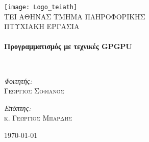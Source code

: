 \begin{titlepage}
\begin{center}

\texttt{[image: Logo\_teiath]}~\\[1cm]

\textsc{\LARGE ΤΕΙ ΑΘΗΝΑΣ ΤΜΗΜΑ ΠΛΗΡΟΦΟΡΙΚΗΣ}\\[1.5cm]

\textsc{\Large ΠΤΥΧΙΑΚΗ ΕΡΓΑΣΙΑ}\\[0.5cm]

\HRule \\[0.4cm]
{ \huge \bfseries Προγραμματισμός με τεχνικές GPGPU \\[0.4cm] }

\HRule \\[1.5cm]

\begin{minipage}{0.4\textwidth}
\begin{flushleft} \large
\emph{Φοιτητής:}\\
\textsc{Γεώργιος Σοφιανός}
\end{flushleft}
\end{minipage}
\begin{minipage}{0.4\textwidth}
\begin{flushright} \large
\emph{Επόπτης:} \\
\textsc{κ. Γεώργιος Μπαρδής}
\end{flushright}
\end{minipage}

\vfill

{\large \today}

\end{center}
\end{titlepage}